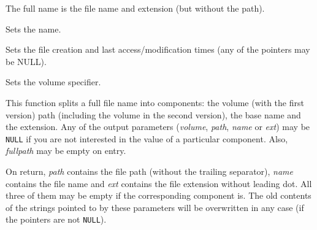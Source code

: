 The full name is the file name and extension (but without the path).


\label{wxfilenamesetname}


Sets the name.


\label{wxfilenamesettimes}


Sets the file creation and last access/modification times (any of the pointers may be NULL).


\label{wxfilenamesetvolume}


Sets the volume specifier.


\label{wxfilenamesplitpath}




This function splits a full file name into components: the volume (with the
first version) path (including the volume in the second version), the base name
and the extension. Any of the output parameters ({\it volume}, {\it path}, 
{\it name} or {\it ext}) may be {\tt NULL} if you are not interested in the
value of a particular component. Also, {\it fullpath} may be empty on entry.

On return, {\it path} contains the file path (without the trailing separator), 
{\it name} contains the file name and {\it ext} contains the file extension
without leading dot. All three of them may be empty if the corresponding
component is. The old contents of the strings pointed to by these parameters
will be overwritten in any case (if the pointers are not {\tt NULL}).

